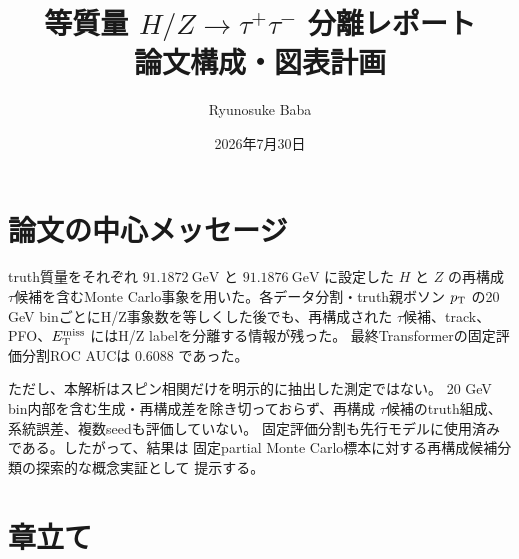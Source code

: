 \documentclass[xelatex,ja=standard,a4paper,10pt]{bxjsarticle}
\title{等質量 \(H/Z\rightarrow\tau^{+}\tau^{-}\) 分離レポート\\
\large 論文構成・図表計画}
\author{Ryunosuke Baba}
\date{2026年7月30日}
\begin{document}
\maketitle

\section{論文の中心メッセージ}

truth質量をそれぞれ \(\SI{91.1872}{\GeV}\) と
\(\SI{91.1876}{\GeV}\) に設定した \(H\) と \(Z\) の再構成
\(\tau\)候補を含むMonte Carlo事象を用いた。各データ分割・truth親ボソン
\(p_{\mathrm{T}}\) の20 GeV binごとにH/Z事象数を等しくした後でも、再構成された
\(\tau\)候補、track、PFO、\(E_{\mathrm{T}}^{\mathrm{miss}}\) にはH/Z labelを分離する情報が残った。
最終Transformerの固定評価分割ROC AUCは \(0.6088\) であった。

ただし、本解析はスピン相関だけを明示的に抽出した測定ではない。
20 GeV bin内部を含む生成・再構成差を除き切っておらず、再構成
\(\tau\)候補のtruth組成、系統誤差、複数seedも評価していない。
固定評価分割も先行モデルに使用済みである。したがって、結果は
固定partial Monte Carlo標本に対する再構成候補分類の探索的な概念実証として
提示する。

\section{章立て}
\end{document}
